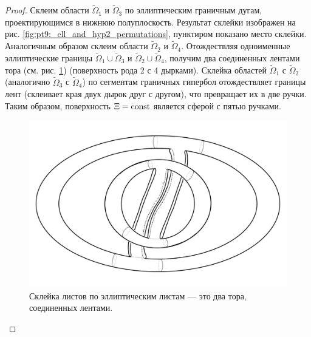 \begin{proof}
Склеим области $\widetilde{\Omega}_1$ и $\widetilde{\Omega}_3$ по эллиптическим граничным дугам, проектирующимся в нижнюю полуплоскость. Результат склейки изображен на рис. \ref{fig:pt9:_ell_and_hyp2_permutations}, пунктиром показано место склейки.  Аналогичным образом склеим области $\widetilde{\Omega}_2$ и $\widetilde{\Omega}_4$. 
Отождествляя одноименные эллиптические границы  $\widetilde{\Omega}_1 \cup \widetilde{\Omega}_3$ и $\widetilde{\Omega}_2 \cup \widetilde{\Omega}_4$, получим два соединенных лентами тора (см. рис. \ref{fig:pt9:_ell_and_hyp2_transformations}) (поверхность рода 2 с 4 дырками). Склейка областей $\widetilde{\Omega}_1$ с $\widetilde{\Omega}_2$ (аналогично $\widetilde{\Omega}
_3$ с $\widetilde{\Omega}_4$) по сегментам граничных гипербол отождествляет границы лент (склеивает края двух дырок друг с другом), что превращает их в две ручки. Таким образом, поверхность $\Xi=\mathrm{const}$ является сферой с пятью ручками.
\begin{figure}[!ht]
\centering
\includegraphics[scale=0.08]{images/ch4/section2/ell_and_hyp2_transformations.pdf}
    \caption{Склейка листов по эллиптическим листам --- это два тора, соединенных лентами.}
    \label{fig:pt9:_ell_and_hyp2_transformations}
\end{figure}
\end{proof}

